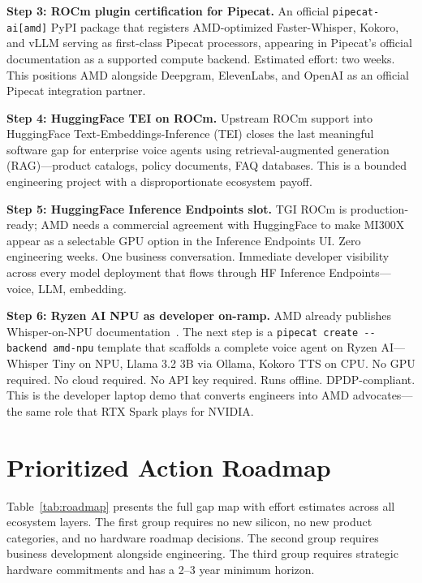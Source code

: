 \documentclass[blind]{gtac}
\begin{document}
\textbf{Step 3: ROCm plugin certification for Pipecat.}
An official \texttt{pipecat-ai[amd]} PyPI package that registers AMD-optimized Faster-Whisper, Kokoro, and vLLM serving as first-class Pipecat processors, appearing in Pipecat's official documentation as a supported compute backend. Estimated effort: two weeks. This positions AMD alongside Deepgram, ElevenLabs, and OpenAI as an official Pipecat integration partner.

\textbf{Step 4: HuggingFace TEI on ROCm.}
Upstream ROCm support into HuggingFace Text-Embeddings-Inference (TEI) closes the last meaningful software gap for enterprise voice agents using retrieval-augmented generation (RAG)---product catalogs, policy documents, FAQ databases. This is a bounded engineering project with a disproportionate ecosystem payoff.

\textbf{Step 5: HuggingFace Inference Endpoints slot.}
TGI ROCm is production-ready; AMD needs a commercial agreement with HuggingFace to make MI300X appear as a selectable GPU option in the Inference Endpoints UI. Zero engineering weeks. One business conversation. Immediate developer visibility across every model deployment that flows through HF Inference Endpoints---voice, LLM, embedding.

\textbf{Step 6: Ryzen AI NPU as developer on-ramp.}
AMD already publishes Whisper-on-NPU documentation~\cite{amd_ryzen_whisper}. The next step is a \texttt{pipecat create {-}{-}backend amd-npu} template that scaffolds a complete voice agent on Ryzen AI---Whisper Tiny on NPU, Llama 3.2 3B via Ollama, Kokoro TTS on CPU. No GPU required. No cloud required. No API key required. Runs offline. DPDP-compliant. This is the developer laptop demo that converts engineers into AMD advocates---the same role that RTX Spark plays for NVIDIA.

\section{Prioritized Action Roadmap}
\label{sec:roadmap}

Table~\ref{tab:roadmap} presents the full gap map with effort estimates across all ecosystem layers. The first group requires no new silicon, no new product categories, and no hardware roadmap decisions. The second group requires business development alongside engineering. The third group requires strategic hardware commitments and has a 2--3 year minimum horizon.
\end{document}
